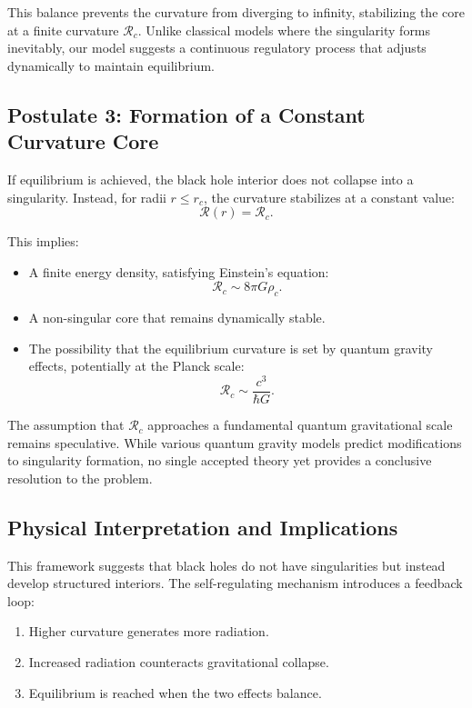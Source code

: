 This balance prevents the curvature from diverging to infinity, stabilizing the core at a finite curvature \( \mathcal{R}_c \). Unlike classical models where the singularity forms inevitably, our model suggests a continuous regulatory process that adjusts dynamically to maintain equilibrium.

\subsection{Postulate 3: Formation of a Constant Curvature Core}

If equilibrium is achieved, the black hole interior does not collapse into a singularity. Instead, for radii \( r \leq r_c \), the curvature stabilizes at a constant value:
\begin{equation}
    \mathcal{R}(r) = \mathcal{R}_c.
\end{equation}

This implies:
\begin{itemize}
    \item A finite energy density, satisfying Einstein’s equation:
    \begin{equation}
        \mathcal{R}_c \sim 8\pi G \rho_c.
    \end{equation}
    \item A non-singular core that remains dynamically stable.
    \item The possibility that the equilibrium curvature is set by quantum gravity effects, potentially at the Planck scale:
    \begin{equation}
        \mathcal{R}_c \sim \frac{c^3}{\hbar G}.
    \end{equation}
\end{itemize}

The assumption that \( \mathcal{R}_c \) approaches a fundamental quantum gravitational scale remains speculative. While various quantum gravity models predict modifications to singularity formation, no single accepted theory yet provides a conclusive resolution to the problem.

\subsection{Physical Interpretation and Implications}

This framework suggests that black holes do not have singularities but instead develop structured interiors. The self-regulating mechanism introduces a feedback loop:
\begin{enumerate}
    \item Higher curvature generates more radiation.
    \item Increased radiation counteracts gravitational collapse.
    \item Equilibrium is reached when the two effects balance.
\end{enumerate}

